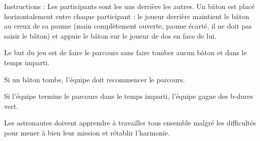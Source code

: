 \documentclass{grand-jeu}
\begin{document}
\begin{liste-materiel}
\end{liste-materiel}

\begin{regles}
Instructions : Les participants sont les uns derrière les autres. Un bâton est placé horizontalement entre chaque participant : le joueur derrière maintient le bâton au creux de sa paume (main complètement ouverte, paume écarté, il ne doit pas saisir le bâton) et appuie le bâton sur le joueur de dos en face de lui.

Le but du jeu est de faire le parcours sans faire tomber aucun bâton et dans le temps imparti.

Si un bâton tombe, l'équipe doit recommencer le parcours.

Si l'équipe termine le parcours dans le temps imparti, l'équipe gagne des b-dures vert. 
\end{regles}

\begin{imaginaire}
Les astronautes doivent apprendre à travailler tous ensemble malgré les difficultés pour mener à bien leur mission et rétablir l'harmonie.
\end{imaginaire}

\begin{moments-stop}
\end{moments-stop}
\end{document}
